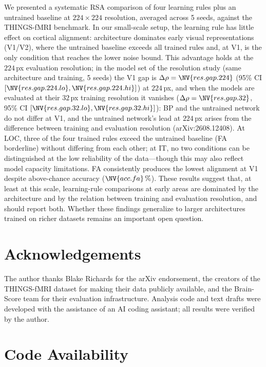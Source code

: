 \documentclass[10pt,twocolumn]{article}
\newcommand{\newid}{arXiv:2608.12408}
\begin{document}
We presented a systematic RSA comparison of four learning rules plus an untrained baseline at $224\times224$ resolution, averaged across 5 seeds, against the THINGS-fMRI benchmark. In our small-scale setup, the learning rule has little effect on cortical alignment: architecture dominates early visual representations (V1/V2), where the untrained baseline exceeds all trained rules and, at V1, is the only condition that reaches the lower noise bound. This advantage holds at the $224$\,px evaluation resolution; in the model set of the resolution study (same architecture and training, 5 seeds) the V1 gap is $\Delta\rho = \NV{res.gap.224}$ (95\% CI $[\NV{res.gap.224.lo},\NV{res.gap.224.hi}]$) at $224$\,px, and when the models are evaluated at their $32$\,px training resolution it vanishes ($\Delta\rho = \NV{res.gap.32}$, 95\% CI $[\NV{res.gap.32.lo},\NV{res.gap.32.hi}]$): BP and the untrained network do not differ at V1, and the untrained network's lead at $224$\,px arises from the difference between training and evaluation resolution (\newid). At LOC, three of the four trained rules exceed the untrained baseline (FA borderline) without differing from each other; at IT, no two conditions can be distinguished at the low reliability of the data---though this may also reflect model capacity limitations. FA consistently produces the lowest alignment at V1 despite above-chance accuracy ($\NV{acc.fa}\,\%$). These results suggest that, at least at this scale, learning-rule comparisons at early areas are dominated by the architecture and by the relation between training and evaluation resolution, and should report both. Whether these findings generalize to larger architectures trained on richer datasets remains an important open question.

\section*{Acknowledgements}

The author thanks Blake Richards for the arXiv endorsement, the creators of the THINGS-fMRI dataset for making their data publicly available, and the Brain-Score team for their evaluation infrastructure. Analysis code and text drafts were developed with the assistance of an AI coding assistant; all results were verified by the author.

\section*{Code Availability}
\end{document}
